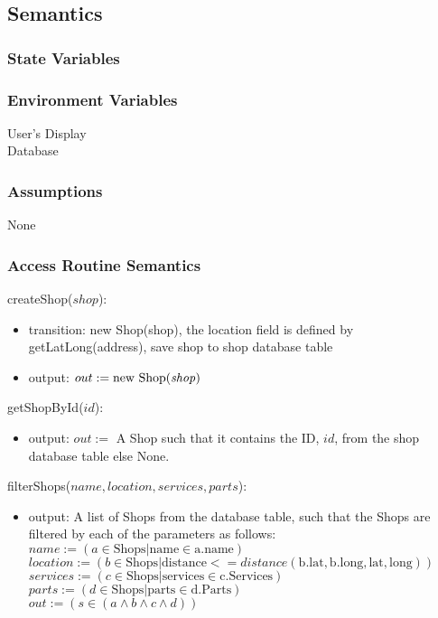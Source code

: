\documentclass[12pt, titlepage]{article}
\begin{document}
\subsection{Semantics}

\subsubsection{State Variables}

\subsubsection{Environment Variables}

User's Display \\ Database

\subsubsection{Assumptions}

None

\subsubsection{Access Routine Semantics}

\noindent createShop($shop$):
\begin{itemize}
	\item transition: new Shop(shop), the location field is defined by getLatLong(address), save shop to shop
	      database table
	\item output: $out := \text{new Shop(\emph{shop})}$
\end{itemize}

\noindent getShopById($id$):
\begin{itemize}
	\item output: $out :=$ A Shop such that it contains the ID, $id$, from the shop database table else None.
\end{itemize}

\noindent filterShops($name, location, services, parts$):
\begin{itemize}
	\item output: A list of Shops from the database table, such that the Shops are filtered by each of the
	      parameters as follows: \\ $name := (a \in \text{Shops} | \text{name} \in \text{a.name})$ \\
	      $location := (b \in \text{Shops} | \text{distance} <= distance(\text{b.lat}, \text{b.long},
		      \text{lat}, \text{long}))$ \\ $services := (c \in \text{Shops} | \text{services} \in
		      \text{c.Services})$ \\ $parts := (d \in \text{Shops} | \text{parts} \in \text{d.Parts})$ \\ $out :=
		      (s \in (a \land b \land c \land d))$
\end{itemize}
\end{document}
